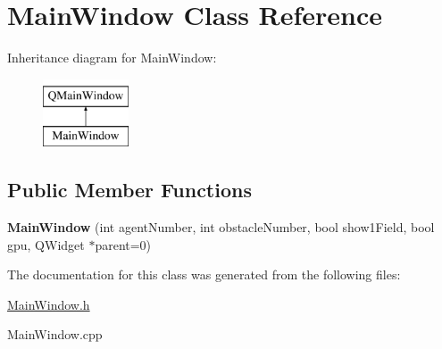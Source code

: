 \hypertarget{class_main_window}{\section{Main\-Window Class Reference}
\label{class_main_window}
}
Inheritance diagram for Main\-Window\-:\begin{figure}[H]
\begin{center}
\leavevmode
\includegraphics[height=2.000000cm]{class_main_window}
\end{center}
\end{figure}
\subsection*{Public Member Functions}
\begin{DoxyCompactItemize}
\item 
\hypertarget{class_main_window_a232aa83c4ded3b19e4811d00ad9ff842}{{\bfseries Main\-Window} (int agent\-Number, int obstacle\-Number, bool show1\-Field, bool gpu, Q\-Widget $\ast$parent=0)}\label{class_main_window_a232aa83c4ded3b19e4811d00ad9ff842}

\end{DoxyCompactItemize}


The documentation for this class was generated from the following files\-:\begin{DoxyCompactItemize}
\item 
\hyperlink{_main_window_8h}{Main\-Window.\-h}\item 
Main\-Window.\-cpp\end{DoxyCompactItemize}
